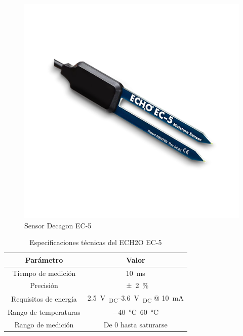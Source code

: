 \documentclass[../main]{subfiles}
\begin{document}
\begin{figure}[H]
	\centering
	\includegraphics[scale = 0.6]{res/sonde-ec-5-decagon_.png}
	\caption{Sensor Decagon EC-5 \supercite{ec5image}}
	\label{fig:ec5fig}
\end{figure}

\begin{table}[H]
	\centering
	\begin{tabular}{c c}
		\toprule
		\multicolumn{1}{c}{\textbf{ Parámetro }} &
		\multicolumn{1}{c}{\textbf{ Valor }}                                                                 \\
		\midrule
		Tiempo de medición                       & \qty{10}{\ms}                                             \\
		Precisión                                & \qty[parse-numbers=false]{\pm 2}{\percent}                \\
		Requisitos de energía                    & \qtyrange{2.5}{3.6}{\V\textsubscript{DC}} @ \qty{10}{\mA} \\
		Rango de temperaturas                    & \qtyrange{-40}{60}{\degreeCelsius}                        \\
		Rango de medición                        & De 0 hasta saturarse                                      \\
		\bottomrule
	\end{tabular}
	\caption{Especificaciones técnicas del ECH2O EC-5 \supercite{ec5humedadsuelosensor}}
	\label{tab:ec5tecesp}
\end{table}
\end{document}
